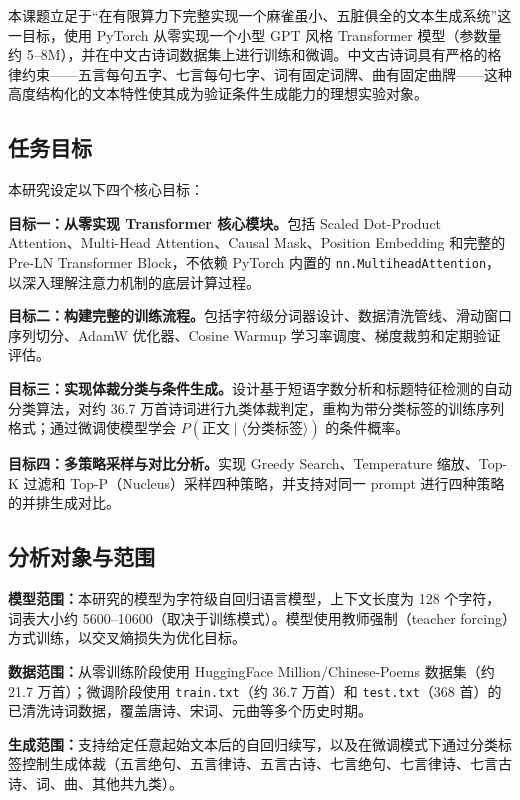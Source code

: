 \documentclass[a4paper, 12pt, centering, AutoFakeBold]{article}
\begin{document}
本课题立足于``在有限算力下完整实现一个麻雀虽小、五脏俱全的文本生成系统''这一目标，使用 PyTorch 从零实现一个小型 GPT 风格 Transformer 模型（参数量约 5--8M），并在中文古诗词数据集上进行训练和微调。中文古诗词具有严格的格律约束——五言每句五字、七言每句七字、词有固定词牌、曲有固定曲牌——这种高度结构化的文本特性使其成为验证条件生成能力的理想实验对象。

\subsection{任务目标}

本研究设定以下四个核心目标：

\textbf{目标一：从零实现 Transformer 核心模块。}包括 Scaled Dot-Product Attention、Multi-Head Attention、Causal Mask、Position Embedding 和完整的 Pre-LN Transformer Block，不依赖 PyTorch 内置的 \texttt{nn.MultiheadAttention}，以深入理解注意力机制的底层计算过程。

\textbf{目标二：构建完整的训练流程。}包括字符级分词器设计、数据清洗管线、滑动窗口序列切分、AdamW 优化器、Cosine Warmup 学习率调度、梯度裁剪和定期验证评估。

\textbf{目标三：实现体裁分类与条件生成。}设计基于短语字数分析和标题特征检测的自动分类算法，对约 36.7 万首诗词进行九类体裁判定，重构为带分类标签的训练序列格式；通过微调使模型学会 $P(\text{正文}\mid\langle\text{分类标签}\rangle)$ 的条件概率。

\textbf{目标四：多策略采样与对比分析。}实现 Greedy Search、Temperature 缩放、Top-K 过滤和 Top-P（Nucleus）采样四种策略，并支持对同一 prompt 进行四种策略的并排生成对比。

\subsection{分析对象与范围}

\textbf{模型范围：}本研究的模型为字符级自回归语言模型，上下文长度为 128 个字符，词表大小约 5600--10600（取决于训练模式）。模型使用教师强制（teacher forcing）方式训练，以交叉熵损失为优化目标。

\textbf{数据范围：}从零训练阶段使用 HuggingFace Million/Chinese-Poems 数据集（约 21.7 万首）；微调阶段使用 \texttt{train.txt}（约 36.7 万首）和 \texttt{test.txt}（368 首）的已清洗诗词数据，覆盖唐诗、宋词、元曲等多个历史时期。

\textbf{生成范围：}支持给定任意起始文本后的自回归续写，以及在微调模式下通过分类标签控制生成体裁（五言绝句、五言律诗、五言古诗、七言绝句、七言律诗、七言古诗、词、曲、其他共九类）。
\end{document}
